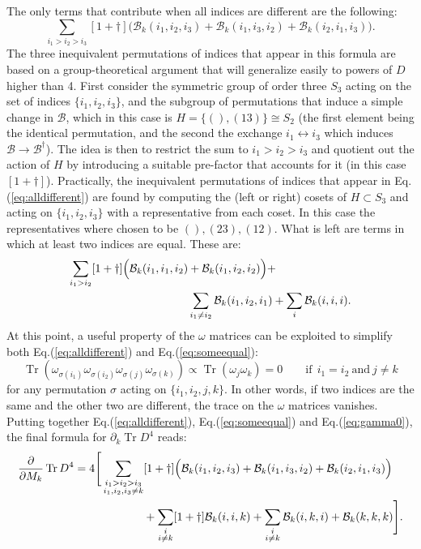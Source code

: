 \documentclass[12pt,a4paper]{article}
\DeclareMathOperator{\Tr}{Tr}
\begin{document}
The only terms that contribute when all indices are different are the following:
\begin{equation} \label{eq:alldifferent}
\sum_{i_1 > i_2 > i_3} [1+\dagger] \Big( \mathcal{B}_k(i_1, i_2, i_3) + \mathcal{B}_k(i_1, i_3, i_2) + \mathcal{B}_k(i_2, i_1, i_3) \Big).
\end{equation}
The three inequivalent permutations of indices that appear in this formula are based on a group-theoretical argument that will generalize easily to powers of $D$ higher than 4. First consider the symmetric group of order three $S_3$ acting on the set of indices $\{i_1, i_2, i_3\}$, and the subgroup of permutations that induce a simple change in $\mathcal{B}$, which in this case is $H = \{(), (13)\} \cong S_2$ (the first element being the identical permutation, and the second the exchange $i_1 \leftrightarrow i_3$ which induces $\mathcal{B} \rightarrow \mathcal{B}^\dagger$). The idea is then to restrict the sum to $i_1 > i_2 > i_3$ and quotient out the action of $H$ by introducing a suitable pre-factor that accounts for it (in this case $[1+\dagger]$). Practically, the inequivalent permutations of indices that appear in Eq.(\ref{eq:alldifferent}) are found by computing the (left or right) cosets of $H \subset S_3$ and acting on $\{i_1, i_2, i_3\}$ with a representative from each coset. In this case the representatives where chosen to be $(), (23), (12)$.\newline
What is left are terms in which at least two indices are equal. These are:
\begin{align} \label{eq:someequal}
\sum_{i_1 > i_2} [1+\dagger] \Big( \mathcal{B}_k(i_1, i_1, i_2) &+ \mathcal{B}_k(i_1, i_2, i_2) \Big) + \notag \\
&\sum_{i_1 \neq i_2} \mathcal{B}_k(i_1, i_2, i_1) + \sum_{i} \mathcal{B}_k(i,i,i).
\end{align}
At this point, a useful property of the $\omega$ matrices can be exploited to simplify both Eq.(\ref{eq:alldifferent}) and Eq.(\ref{eq:someequal}):
\begin{equation}\label{eq:gamma0}
\Tr(\omega_{\sigma(i_1)} \omega_{\sigma(i_2)} \omega_{\sigma(j)} \omega_{\sigma(k)}) \propto \Tr(\omega_j \omega_k) = 0 \qquad \text{if} \ \ i_1 = i_2 \ \text{and} \ j \neq k
\end{equation}
for any permutation $\sigma$ acting on $\{i_1, i_2, j, k\}$. In other words, if two indices are the same and the other two are different, the trace on the $\omega$ matrices vanishes.\newline
Putting together Eq.(\ref{eq:alldifferent}), Eq.(\ref{eq:someequal}) and Eq.(\ref{eq:gamma0}), the final formula for $\partial_k \Tr D^4$ reads:
\begin{align} 
\frac{\partial}{\partial M_k} \Tr D^4 = 4 \Bigg[ \sum_{\substack{i_1 > i_2 > i_3 \\ i_1,i_2,i_3 \neq k}} &[1+\dagger] \Big( \mathcal{B}_k(i_1, i_2, i_3) + \mathcal{B}_k(i_1, i_3, i_2) + \mathcal{B}_k(i_2, i_1, i_3) \Big) \notag \\
&+ \sum_{\substack{i \\ i \neq k}} [1+\dagger] \mathcal{B}_k(i, i, k) + \sum_{\substack{i \\ i \neq k}} \mathcal{B}_k(i, k, i) + \mathcal{B}_k(k,k,k) \Bigg].
\end{align}
\end{document}
